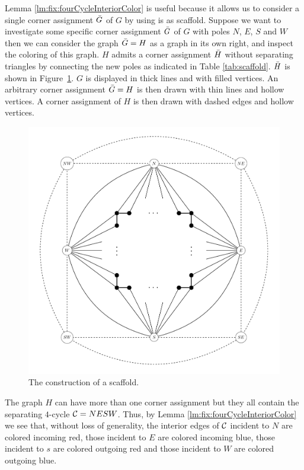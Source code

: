   Lemma \ref{lm:fix:fourCycleInteriorColor} is useful because it allows us to consider a single corner assignment $\bar{G}$ of $G$ by using is as scaffold. Suppose we want to investigate some specific corner assignment $\bar{G}$ of $G$ with poles $N$, $E$, $S$ and $W$ then we can consider the graph $\bar{G} = H$ as a graph in its own right, and inspect the coloring of this graph.
  $H$ admits a corner assignment $\bar{H}$ without separating triangles by connecting the new poles as indicated in Table \ref{tab:scaffold}.
  $\bar{H}$ is shown in Figure~\ref{fig:scafold}.
  $G$ is displayed in thick lines and with filled vertices.
  An arbitrary corner assignment $\bar{G} =H$ is then drawn with thin lines and hollow vertices.
  A corner assignment of $H$ is then drawn with dashed edges and hollow vertices.

  \begin{figure}[t]
  \centering
  \includegraphics[scale=0.5]{fixExtension/img/scafold}

  \caption{The construction of a scaffold.
      \label{fig:scafold}}
  \end{figure}


  The graph $H$ can have more than one corner assignment but they all contain the separating $4$-cycle $\mathcal{C}= NESW$. Thus, by Lemma \ref{lm:fix:fourCycleInteriorColor} we see that, without loss of generality, the interior edges of $\mathcal{C}$ incident to $N$ are colored incoming red, those incident to $E$ are colored incoming blue, those incident to $s$ are colored outgoing red and those incident to $W$ are colored outgoing blue.

